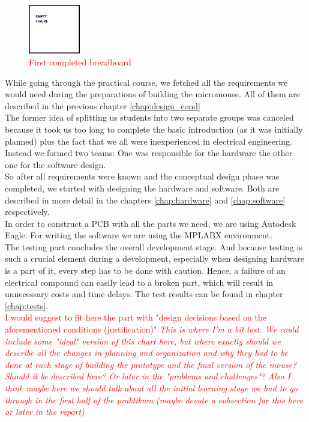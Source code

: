 \begin{figure}[H]
    \centering
    \includegraphics[width=0.2\textwidth]{figures/filler.png}
    \caption{\textcolor{red}{First completed breadboard}}
    \label{fig:breadboard}
\end{figure}

\noindent
While going through the practical course, we fetched all the requirements we would need during the preparations of building the micromouse. All of them are described in the previous chapter \ref{chap:design_cond} \\

\noindent
The former idea of splitting us students into two separate groups was canceled because it took us too long to complete the basic introduction (as it was initially planned) plus the fact that we all were inexperienced in electrical engineering. Instead we formed two teams: One was responsible for the hardware the other one for the software design. \\
So after all requirements were known and the conceptual design phase was completed, we started with designing the hardware and software. Both are described in more detail in the chapters \ref{chap:hardware} and \ref{chap:software} respectively. \\
In order to construct a PCB with all the parts we need, we are using Autodesk Eagle. For writing the software we are using the MPLABX environment. \\

\noindent
The testing part concludes the overall development stage. And because testing is such a crucial element during a development, especially when designing hardware is a part of it, every step has to be done with caution. Hence, a failure of an electrical compound can easily lead to a broken part, which will result in unnecessary costs and time delays. The test results can be found in chapter \ref{chap:tests}. \\

\textcolor{red}{I would suggest to fit here the part with "design decisions based on the aforementioned conditions (justification)"
\textit{ This is where I'm a bit lost. We could include some "ideal" version of this chart here, but where exactly should we describe all the changes in planning and organization and why they had to be done at each stage of building the prototype and the final version of the mouse?  Should it be described here? Or later in the "problems and challenges"?
Also I think maybe here we should talk about all the initial learning stage we had to go through in the first half of the praktikum (maybe devote a subsection for this here or later in the report)}}

